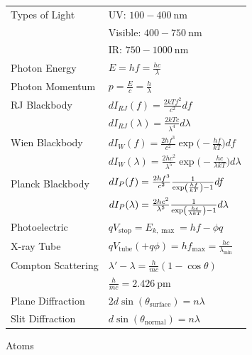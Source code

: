 \documentclass[10pt]{article}
\makeatletter
\newcommand{\lrb}[1]{\left(#1\right)}
\let\originalleft\left
\let\originalright\right
\renewcommand{\left}{\mathopen{}\mathclose\bgroup\originalleft}
\renewcommand{\right}{\aftergroup\egroup\originalright}
\renewcommand{\section}{\@startsection{section}{1}{0ex}
                                {-1ex}
                                {0.7ex}
                                {\normalfont\large\bfseries}}
\renewcommand{\stop}{\text{stop}}
\newcommand{\tube}{\text{tube}}
\newcommand{\surface}{\text{surface}}
\newcommand{\normal}{\text{normal}}
\makeatother
\begin{document}
\begin{multicols*}{3}
{\renewcommand{\arraystretch}{1.4}
\begin{tabular}{@{}ll}
    Types of Light & UV: $100-\SI{400}{\nm}$ \\
    & Visible: $400-\SI{750}{\nm}$ \\
    & IR: $750-\SI{1000}{\nm}$ \\
    Photon Energy & $E=hf=\frac{hc}{\lambda}$ \\
    Photon Momentum & $p=\frac Ec=\frac h\lambda$ \\
    RJ Blackbody & $dI_{RJ}(f)=\frac{2kTf^2}{c^2}df$ \\
    & $dI_{RJ}(\lambda)=\frac{2kTc}{\lambda^4}d\lambda$ \\
    Wien Blackbody & $dI_W(f)=\frac{2hf^3}{c^2}\exp\bigl(-\frac{hf}{kT}\bigr)df$ \\
    & $dI_W(\lambda)=\frac{2hc^2}{\lambda^5}\exp\bigl(-\frac{hc}{\lambda kT}\bigr)d\lambda$ \\
    Planck Blackbody & $dI_P(f)=\frac{2hf^3}{c^2}\frac{1}{\exp\lrb{\frac{hf}{kT}}-1}df$ \\ 
    & $dI_P(\lambda)=\frac{2hc^2}{\lambda^5}\frac{1}{\exp\lrb{\frac{hc}{\lambda kT}}-1}d\lambda$ \\
    Photoelectric & $qV_{\stop}=E_{k,\max}=hf-\phi q$ \\
    X-ray Tube & $qV_{\tube}(+q\phi)=hf_{\max}=\frac{hc}{\lambda_{\min}}$ \\
    Compton Scattering & $\lambda'-\lambda=\frac{h}{mc}(1-\cos\theta)$ \\
    & $\frac{h}{mc}=\SI{2.426}{\pm}$ \\
    Plane Diffraction & $2d\sin(\theta_\surface)=n\lambda$ \\
    Slit Diffraction & $d\sin(\theta_\normal)=n\lambda$
\end{tabular}}

\section{Atoms}


\end{multicols*}
\end{document}
